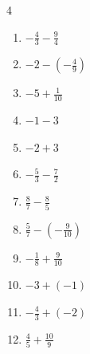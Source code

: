 \begin{multicols}{4}
\begin{enumerate}
  \item $\displaystyle -\frac{4}{3} - \frac{9}{4}$


  \item $\displaystyle -2 - \left(-\frac{4}{9}\right)$


  \item $\displaystyle -5 + \frac{1}{10}$


\columnbreak %

  \item $\displaystyle -1 - 3$

        \phantom{$\displaystyle =-4$}

  \item $\displaystyle -2 + 3$

        \phantom{$\displaystyle =1$}

  \item $\displaystyle -\frac{5}{3} - \frac{7}{2}$


  \item $\displaystyle \frac{8}{7} - \frac{8}{5}$


  \item $\displaystyle \frac{5}{7} - \left(-\frac{9}{10}\right)$


  \item $\displaystyle -\frac{1}{8} + \frac{9}{10}$


  \item $\displaystyle -3 + \left(-1\right)$

        \phantom{$\displaystyle =-4$}

  \item $\displaystyle -\frac{4}{3} + \left(-2\right)$


  \item $\displaystyle \frac{4}{5} + \frac{10}{9}$



\end{enumerate}
\end{multicols}
